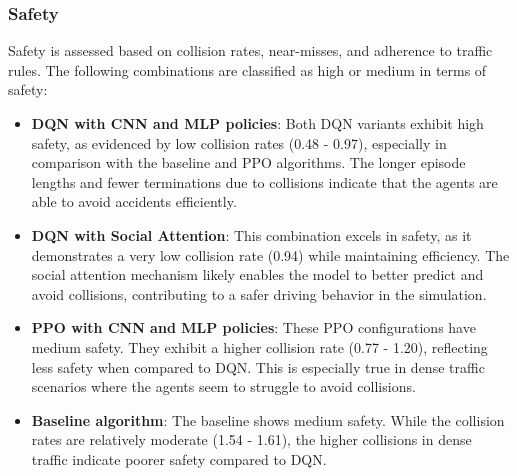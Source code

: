 \subsubsection{Safety}
Safety is assessed based on collision rates, near-misses, and adherence to traffic rules. The following combinations are classified as high or medium in terms of safety:
\begin{itemize}
    \item \textbf{DQN with CNN and MLP policies}: Both DQN variants exhibit high safety, as evidenced by low collision rates (0.48 - 0.97), especially in comparison with the baseline and PPO algorithms. The longer episode lengths and fewer terminations due to collisions indicate that the agents are able to avoid accidents efficiently.
    \item \textbf{DQN with Social Attention}: This combination excels in safety, as it demonstrates a very low collision rate (0.94) while maintaining efficiency. The social attention mechanism likely enables the model to better predict and avoid collisions, contributing to a safer driving behavior in the simulation.
    \item \textbf{PPO with CNN and MLP policies}: These PPO configurations have medium safety. They exhibit a higher collision rate (0.77 - 1.20), reflecting less safety when compared to DQN. This is especially true in dense traffic scenarios where the agents seem to struggle to avoid collisions.
    \item \textbf{Baseline algorithm}: The baseline shows medium safety. While the collision rates are relatively moderate (1.54 - 1.61), the higher collisions in dense traffic indicate poorer safety compared to DQN.
\end{itemize}

